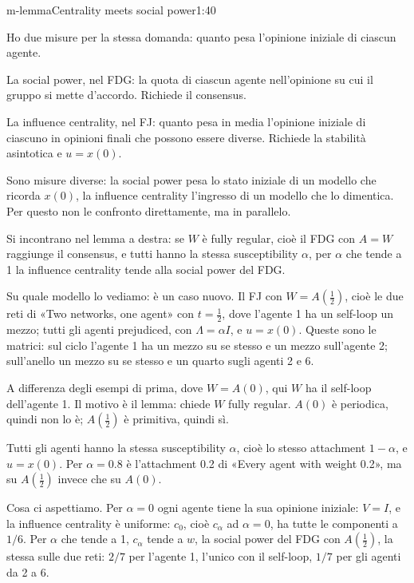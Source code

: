 \begin{slidetre}{m-lemma}{Centrality meets social power}{1:40}
  \begin{discorso}
    \item Ho due misure per la stessa domanda: quanto pesa l'opinione iniziale di ciascun agente.
    \item La social power, nel FDG: la quota di ciascun agente nell'opinione su cui il gruppo si mette d'accordo. Richiede il consensus.
    \item La influence centrality, nel FJ: quanto pesa in media l'opinione iniziale di ciascuno in opinioni finali che possono essere diverse. Richiede la stabilità asintotica e $u=x(0)$.
    \item Sono misure diverse: la social power pesa lo stato iniziale di un modello che ricorda $x(0)$, la influence centrality l'ingresso di un modello che lo dimentica. Per questo non le confronto direttamente, ma in parallelo.
    \item Si incontrano nel lemma a destra: se $W$ è fully regular, cioè il FDG con $A=W$ raggiunge il consensus, e tutti hanno la stessa susceptibility $\alpha$, per $\alpha$ che tende a 1 la influence centrality tende alla social power del FDG.
    \item \clic Su quale modello lo vediamo: è un caso nuovo. Il FJ con $W=A(\tfrac12)$, cioè le due reti di «Two networks, one agent» con $t=\tfrac12$, dove l'agente 1 ha un self-loop un mezzo; tutti gli agenti prejudiced, con $\Lambda=\alpha I$, e $u=x(0)$. Queste sono le matrici: sul ciclo l'agente 1 ha un mezzo su se stesso e un mezzo sull'agente 2; sull'anello un mezzo su se stesso e un quarto sugli agenti 2 e 6.
    \item A differenza degli esempi di prima, dove $W=A(0)$, qui $W$ ha il self-loop dell'agente 1. Il motivo è il lemma: chiede $W$ fully regular. $A(0)$ è periodica, quindi non lo è; $A(\tfrac12)$ è primitiva, quindi sì.
    \item Tutti gli agenti hanno la stessa susceptibility $\alpha$, cioè lo stesso attachment $1-\alpha$, e $u=x(0)$. Per $\alpha=0.8$ è l'attachment 0.2 di «Every agent with weight 0.2», ma su $A(\tfrac12)$ invece che su $A(0)$.
    \item Cosa ci aspettiamo. Per $\alpha=0$ ogni agente tiene la sua opinione iniziale: $V=I$, e la influence centrality è uniforme: $c_0$, cioè $c_\alpha$ ad $\alpha=0$, ha tutte le componenti a $1/6$. Per $\alpha$ che tende a 1, $c_\alpha$ tende a $w$, la social power del FDG con $A(\tfrac12)$, la stessa sulle due reti: $2/7$ per l'agente 1, l'unico con il self-loop, $1/7$ per gli agenti da 2 a 6.

\end{discorso}
\end{slidetre}
